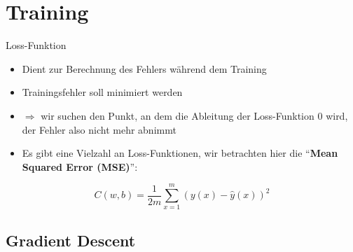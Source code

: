 \section{Training}%
\label{sec:train}

\begin{frame}{Loss-Funktion}
  \begin{itemize}
  \item Dient zur Berechnung des Fehlers während dem Training
  \item Trainingsfehler soll minimiert werden
  \item \(\Rightarrow\) wir suchen den Punkt, an dem die Ableitung der
    Loss-Funktion \(0\) wird, der Fehler also nicht mehr abnimmt
  \item Es gibt eine Vielzahl an Loss-Funktionen, wir betrachten hier
    die \enquote{\textbf{Mean Squared Error (MSE)}}:
  \end{itemize}

  \vspace{.6cm}

  \begin{minipage}{.4\linewidth}
    \[C(w, b) = \frac{1}{2m} \sum_{x=1}^{m} (y(x) - \hat{y}(x))^2\]
  \end{minipage}\hfill%
  \begin{minipage}{.55\linewidth}
  \end{minipage}
\end{frame}

\subsection{Gradient Descent}%
\label{sec:graddesc}

